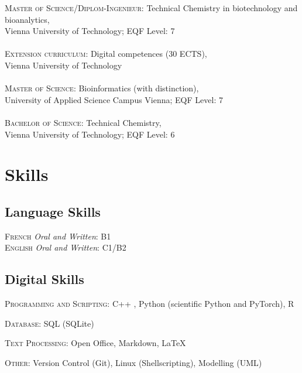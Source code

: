 \documentclass[14pt]{article} %
\begin{document}
\textsc{Master of Science/Diplom-Ingenieur}: Technical Chemistry in biotechnology and bioanalytics,\\ Vienna University of Technology; EQF Level: 7\\
\\
\textsc{Extension curriculum}: Digital competences (30 ECTS),\\ Vienna University of Technology\\
\\
\textsc{Master of Science}: Bioinformatics (with distinction),\\ University of Applied Science Campus Vienna; EQF Level: 7\\
\\
\textsc{Bachelor of Science}: Technical Chemistry,\\ Vienna University of Technology; EQF Level: 6\\



\section*{Skills}

\subsection*{Language Skills}

\textsc{French} \textit{Oral and Written}: B1 \\
\textsc{English} \textit{Oral and Written}: C1/B2

\subsection*{Digital Skills}

\textsc{Programming and Scripting:} C++ , Python (scientific Python and PyTorch), R

\textsc{Database:} SQL (SQLite)

\textsc{Text Processing:} Open Office, Markdown, \LaTeX

\textsc{Other:} Version Control (Git), Linux (Shellscripting), Modelling (UML)
\end{document}
